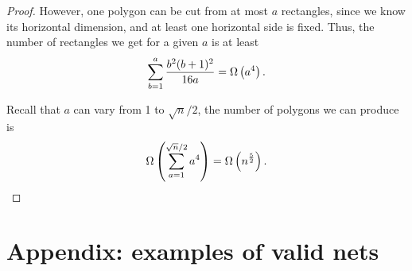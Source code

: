 \documentclass[a4paper,11pt]{article}
\begin{document}
\begin{proof}
However, one polygon can be cut from at most $a$ rectangles, since we know its horizontal dimension, and at least one horizontal side is fixed. Thus, the number of rectangles we get for a given $a$ is at least
\[ \sum\limits_{b=1}^a \frac{b^2 (b+1)^2}{16a} = \Omega\left( a^4 \right). \]

Recall that $a$ can vary from 1 to $\sqrt n / 2$, the number of polygons we can produce is
\[ \Omega \left( \sum\limits_{a=1}^{\sqrt n / 2} a^4 \right) = \Omega \left( n^\frac{5}{2} \right). \]

\end{proof}

\section*{Appendix: examples of valid nets}





% 
\end{document}
